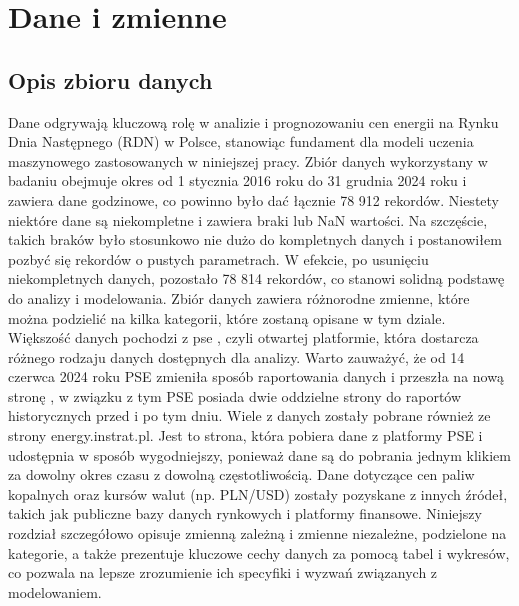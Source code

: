 \chapter{Dane i zmienne}
\label{ch:dane}
\section{Opis zbioru danych}
Dane odgrywają kluczową rolę w analizie i prognozowaniu cen energii na Rynku Dnia Następnego (RDN) w Polsce, stanowiąc fundament dla modeli uczenia maszynowego zastosowanych w niniejszej pracy. Zbiór danych wykorzystany w badaniu obejmuje okres od 1 stycznia 2016 roku do 31 grudnia 2024 roku i zawiera dane godzinowe, co powinno było dać łącznie 78 912 rekordów. Niestety niektóre dane są niekompletne i zawiera braki lub NaN wartości. Na szczęście, takich braków było stosunkowo nie dużo do kompletnych danych i postanowiłem pozbyć się rekordów o pustych parametrach. W efekcie, po usunięciu niekompletnych danych, pozostało 78 814 rekordów, co stanowi solidną podstawę do analizy i modelowania. Zbiór danych zawiera różnorodne zmienne, które można podzielić na kilka kategorii, które zostaną opisane w tym dziale. Większość danych pochodzi z \gls{pse} \cite{PSEOLD}, czyli otwartej platformie, która dostarcza różnego rodzaju danych dostępnych dla analizy. Warto zauważyć, że od 14 czerwca 2024 roku PSE zmieniła sposób raportowania danych i przeszła na nową stronę \cite{PSENEW}, w związku z tym PSE posiada dwie oddzielne strony do raportów historycznych przed i po tym dniu. Wiele z danych zostały pobrane również ze strony energy.instrat.pl. Jest to strona, która pobiera dane z platformy PSE i udostępnia w sposób wygodniejszy, ponieważ dane są do pobrania jednym klikiem za dowolny okres czasu z dowolną częstotliwością. Dane dotyczące cen paliw kopalnych oraz kursów walut (np. PLN/USD) zostały pozyskane z innych źródeł, takich jak publiczne bazy danych rynkowych i platformy finansowe. Niniejszy rozdział szczegółowo opisuje zmienną zależną i zmienne niezależne, podzielone na kategorie, a także prezentuje kluczowe cechy danych za pomocą tabel i wykresów, co pozwala na lepsze zrozumienie ich specyfiki i wyzwań związanych z modelowaniem.

